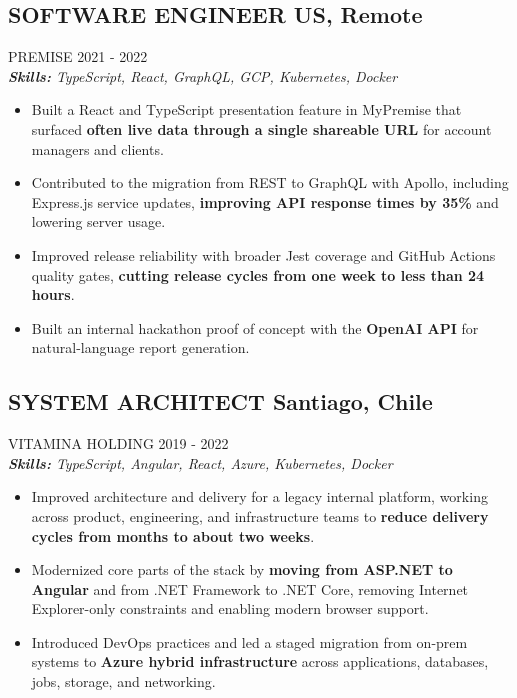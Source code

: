 \documentclass{article}
\newcommand{\WorkExperience}[2]{
   \subsection*{#1}
   \vspace{-1em}
   \uppercase{#2}
}
\newcommand{\Skills}[1]{
   \textit{\textbf{Skills:} #1}
}
\begin{document}
\WorkExperience{SOFTWARE ENGINEER \hfill US, Remote}{Premise \hfill 2021 {-} 2022} \\
\Skills{TypeScript, React, GraphQL, GCP, Kubernetes, Docker}
\begin{itemize}
	\item Built a React and TypeScript presentation feature in MyPremise that surfaced \textbf{often live data through a single shareable URL} for account managers and clients.
	\item Contributed to the migration from REST to GraphQL with Apollo, including Express.js service updates, \textbf{improving API response times by 35\%} and lowering server usage.
	\item Improved release reliability with broader Jest coverage and GitHub Actions quality gates, \textbf{cutting release cycles from one week to less than 24 hours}.
	\item Built an internal hackathon proof of concept with the \textbf{OpenAI API} for natural-language report generation.
\end{itemize}

\WorkExperience{SYSTEM ARCHITECT \hfill Santiago, Chile}{Vitamina Holding \hfill 2019 {-} 2022} \\
\Skills{TypeScript, Angular, React, Azure, Kubernetes, Docker}
\begin{itemize}
	\item Improved architecture and delivery for a legacy internal platform, working across product, engineering, and infrastructure teams to \textbf{reduce delivery cycles from months to about two weeks}.
	\item Modernized core parts of the stack by \textbf{moving from ASP.NET to Angular} and from .NET Framework to .NET Core, removing Internet Explorer-only constraints and enabling modern browser support.
	\item Introduced DevOps practices and led a staged migration from on-prem systems to \textbf{Azure hybrid infrastructure} across applications, databases, jobs, storage, and networking.
\end{itemize}
\end{document}
